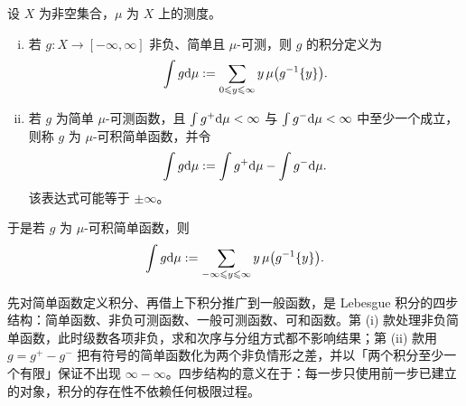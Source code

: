 \documentclass[../../main.tex]{subfiles}%
\begin{document}
\begin{definition}[简单函数的积分]\label{definition:ch01-1-12}
设 $X$ 为非空集合，$\mu$ 为 $X$ 上的测度。
\begin{enumerate}[(i)]
\item 若 $g:X\to[-\infty,\infty]$ 非负、简单且 $\mu$-可测，则 $g$ 的积分定义为
\begin{align*}
\int g\mathrm{d}\mu:=\sum_{0\leqslant y\leqslant\infty}y\,\mu\bigl(g^{-1}\{y\}\bigr).
\end{align*}
\item 若 $g$ 为简单 $\mu$-可测函数，且 $\int g^{+}\mathrm{d}\mu<\infty$ 与 $\int g^{-}\mathrm{d}\mu<\infty$ 中至少一个成立，则称 $g$ 为 $\mu$-可积简单函数，并令
\begin{align*}
\int g\mathrm{d}\mu:=\int g^{+}\mathrm{d}\mu-\int g^{-}\mathrm{d}\mu .
\end{align*}
该表达式可能等于 $\pm\infty$。
\end{enumerate}
于是若 $g$ 为 $\mu$-可积简单函数，则
\begin{align*}
\int g\mathrm{d}\mu:=\sum_{-\infty\leqslant y\leqslant\infty}y\,\mu\bigl(g^{-1}\{y\}\bigr).
\end{align*}
\end{definition}

\begin{remark}\label{remark:ch01-def-1-12-动机}
先对简单函数定义积分、再借上下积分推广到一般函数，是 Lebesgue 积分的四步结构：简单函数、非负可测函数、一般可测函数、可和函数。第 (i) 款处理非负简单函数，此时级数各项非负，求和次序与分组方式都不影响结果；第 (ii) 款用 $g=g^{+}-g^{-}$ 把有符号的简单函数化为两个非负情形之差，并以「两个积分至少一个有限」保证不出现 $\infty-\infty$。四步结构的意义在于：每一步只使用前一步已建立的对象，积分的存在性不依赖任何极限过程。
\end{remark}
\end{document}
